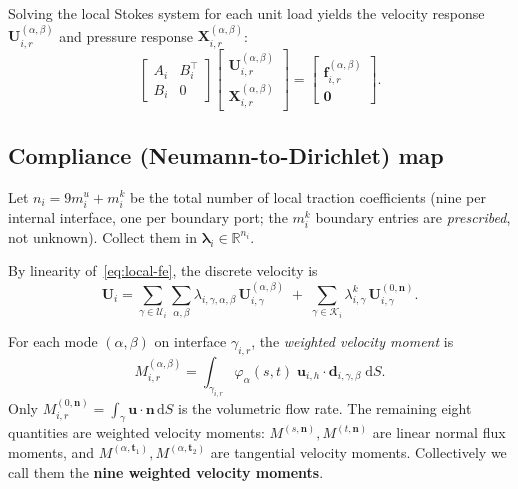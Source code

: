 \documentclass[11pt,a4paper]{article}
\newcommand{\R}{\mathbb{R}}
\newcommand{\iface}{\gamma}
\newcommand{\vel}{\bm{u}}
\newcommand{\normal}{\bm{n}}
\newcommand{\trac}{\bm{\lambda}}
\begin{document}
Solving the local Stokes system for each unit load yields the velocity
response $\mathbf{U}_{i,r}^{(\alpha,\beta)}$ and pressure response
$\mathbf{X}_{i,r}^{(\alpha,\beta)}$:
\begin{equation}\label{eq:response}
  \begin{bmatrix} A_i & B_i^\top \\ B_i & 0 \end{bmatrix}
  \begin{bmatrix} \mathbf{U}_{i,r}^{(\alpha,\beta)} \\
                   \mathbf{X}_{i,r}^{(\alpha,\beta)} \end{bmatrix}
  = \begin{bmatrix} \bm{f}_{i,r}^{(\alpha,\beta)} \\ \bm{0} \end{bmatrix}.
\end{equation}

\subsection{Compliance (Neumann-to-Dirichlet) map}

Let $n_i = 9m_i^u + m_i^k$ be the total number of local traction
coefficients (nine per internal interface, one per boundary port;
the $m_i^k$ boundary entries are \emph{prescribed}, not unknown).
Collect them in $\trac_i \in \R^{n_i}$.

By linearity of~\eqref{eq:local-fe}, the discrete velocity is
\begin{equation}\label{eq:velocity-linear}
  \mathbf{U}_i
  = \sum_{\gamma\in\mathcal{U}_i}\sum_{\alpha,\beta}
    \lambda_{i,\gamma,\alpha,\beta}\,
    \mathbf{U}_{i,\gamma}^{(\alpha,\beta)}
  \;+\; \sum_{\gamma\in\mathcal{K}_i}
    \lambda_{i,\gamma}^k\,
    \mathbf{U}_{i,\gamma}^{(0,\normal)}.
\end{equation}

For each mode $(\alpha,\beta)$ on interface $\iface_{i,r}$, the
\emph{weighted velocity moment} is
\begin{equation}\label{eq:moment}
  M_{i,r}^{(\alpha,\beta)}
  = \int_{\iface_{i,r}} \varphi_\alpha(s,t)\;
    \vel_{i,h} \cdot \bm{d}_{i,\gamma,\beta} \;\mathrm{d}S.
\end{equation}
Only $M_{i,r}^{(0,\normal)} = \int_\gamma \vel\cdot\normal\,\mathrm{d}S$
is the volumetric flow rate.  The remaining eight quantities are
weighted velocity moments: $M^{(s,\normal)},M^{(t,\normal)}$ are
linear normal flux moments, and
$M^{(\alpha,\bm{t}_1)},M^{(\alpha,\bm{t}_2)}$
are tangential velocity moments.  Collectively we call them the
\textbf{nine weighted velocity moments}.
\end{document}
